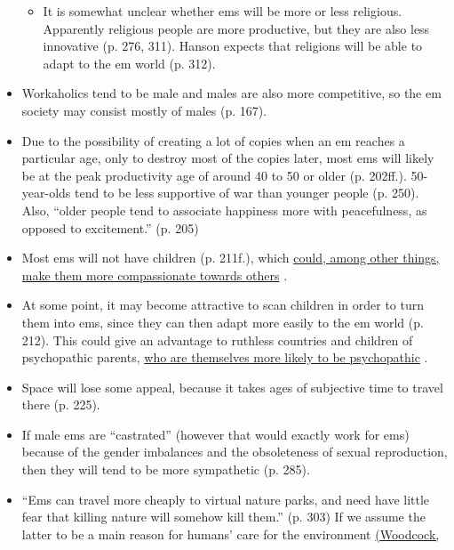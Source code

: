 \documentclass[]{article}
\begin{document}
\begin{itemize}
  \begin{itemize}
  \item
    It is somewhat unclear whether ems will be more or less religious.
    Apparently religious people are more productive, but they are also
    less innovative (p. 276, 311). Hanson expects that religions will be
    able to adapt to the em world (p. 312).
  \end{itemize}
\item
  Workaholics tend to be male and males are also more competitive, so
  the em society may consist mostly of males (p. 167).
\item
  Due to the possibility of creating a lot of copies when an em reaches
  a particular age, only to destroy most of the copies later, most ems
  will likely be at the peak productivity age of around 40 to 50 or
  older (p. 202ff.). 50-year-olds tend to be less supportive of war than
  younger people (p. 250). Also, ``older people tend to associate
  happiness more with peacefulness, as opposed to excitement.'' (p. 205)
\item
  Most ems will not have children (p. 211f.), which
  \href{http://www.theatlantic.com/health/archive/2015/11/having-kids-can-make-parents-less-empathetic/416592/}{could,
  among other things, make them more compassionate towards others}
  \parencite{Gilead2014-rv}.
\item
  At some point, it may become attractive to scan children in order to
  turn them into ems, since they can then adapt more easily to the em
  world (p. 212). This could give an advantage to ruthless countries and
  children of psychopathic parents,
  \href{http://aftermath-surviving-psychopathy.org/index.php/is-psychopathy-genetic/}{who
  are themselves more likely to be psychopathic}
  \parencite{Viding2010-my,Waldman2006-ka,Farrington2006-az}.
\item
  Space will lose some appeal, because it takes ages of subjective time
  to travel there (p. 225).
\item
  If male ems are ``castrated'' (however that would exactly work for
  ems) because of the gender imbalances and the obsoleteness of sexual
  reproduction, then they will tend to be more sympathetic (p. 285).
\item
  ``Ems can travel more cheaply to virtual nature parks, and need have
  little fear that killing nature will somehow kill them.'' (p. 303) If
  we assume the latter to be a main reason for humans' care for the
  environment
  \href{http://www.collectionscanada.gc.ca/obj/s4/f2/dsk3/ftp04/NQ59050.pdf\#page=165}{(Woodcock,
}
\end{itemize}
\end{document}

